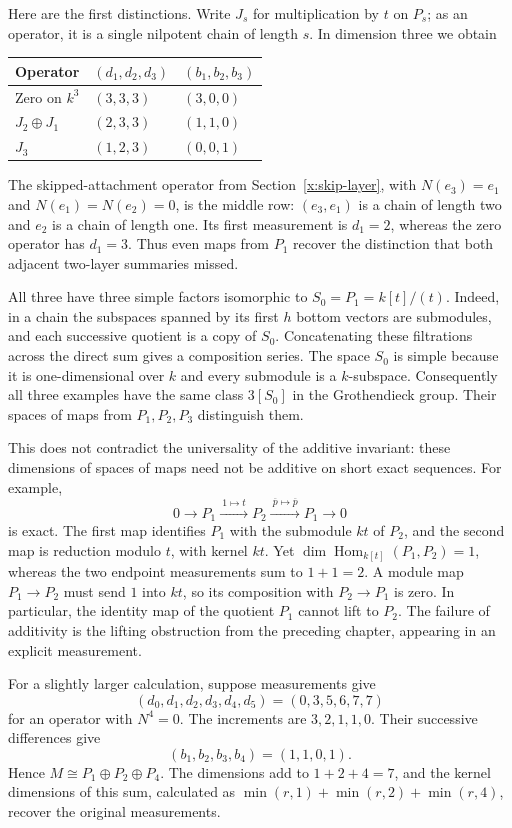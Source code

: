 \documentclass[11pt]{article}
\theoremstyle{definition}
\theoremstyle{remark}\newtheorem{remark}[theorem]{Remark}
\DeclareMathOperator{\Hom}{Hom}
\begin{document}
Here are the first distinctions. Write $J_s$ for multiplication by $t$ on
$P_s$; as an operator, it is a single nilpotent chain of length $s$.
In dimension three we obtain
\begin{center}
\begin{tabular}{@{}lll@{}}
\toprule
Operator & $(d_1,d_2,d_3)$ & $(b_1,b_2,b_3)$ \\
\midrule
Zero on $k^3$ & $(3,3,3)$ & $(3,0,0)$ \\
$J_2\oplus J_1$ & $(2,3,3)$ & $(1,1,0)$ \\
$J_3$ & $(1,2,3)$ & $(0,0,1)$ \\
\bottomrule
\end{tabular}
\end{center}
The skipped-attachment operator from Section~\ref{x:skip-layer},
with $N(e_3)=e_1$ and $N(e_1)=N(e_2)=0$, is the middle row:
$(e_3,e_1)$ is a chain of length two and $e_2$ is a chain of length one.
Its first measurement is $d_1=2$, whereas the zero operator has $d_1=3$.
Thus even maps from $P_1$ recover the distinction that both adjacent
two-layer summaries missed.

All three have three simple factors isomorphic to
$S_0=P_1=k[t]/(t)$. Indeed, in a chain the subspaces spanned by its first
$h$ bottom vectors are submodules, and each successive quotient is a copy
of $S_0$. Concatenating these filtrations across the direct sum gives a
composition series. The space $S_0$ is simple because it is
one-dimensional over $k$ and every submodule is a $k$-subspace.
Consequently all three examples have the same class $3[S_0]$ in the
Grothendieck group. Their spaces of maps from $P_1,P_2,P_3$ distinguish them.

This does not contradict the universality of the additive invariant:
these dimensions of spaces of maps need not be additive on short exact
sequences. For example,
\[
 0\longrightarrow P_1\xrightarrow{\ 1\mapsto t\ }P_2
 \xrightarrow{\ \overline p\mapsto\overline p\ }P_1
 \longrightarrow0
\]
is exact. The first map identifies $P_1$ with the submodule $kt$ of
$P_2$, and the second map is reduction modulo $t$, with kernel $kt$.
Yet $\dim\Hom_{k[t]}(P_1,P_2)=1$, whereas the two endpoint measurements
sum to $1+1=2$. A module map $P_1\to P_2$ must send $1$ into $kt$, so its
composition with $P_2\to P_1$ is zero. In particular, the identity map
of the quotient $P_1$ cannot lift to $P_2$. The failure of additivity is
the lifting obstruction from the preceding chapter, appearing in an
explicit measurement.

For a slightly larger calculation, suppose measurements give
\[
 (d_0,d_1,d_2,d_3,d_4,d_5)=(0,3,5,6,7,7)
\]
for an operator with $N^4=0$. The increments are
$3,2,1,1,0$. Their successive differences give
\[
 (b_1,b_2,b_3,b_4)=(1,1,0,1).
\]
Hence $M\cong P_1\oplus P_2\oplus P_4$. The dimensions add to
$1+2+4=7$, and the kernel dimensions of this sum, calculated as
$\min(r,1)+\min(r,2)+\min(r,4)$, recover the original measurements.
\end{document}
